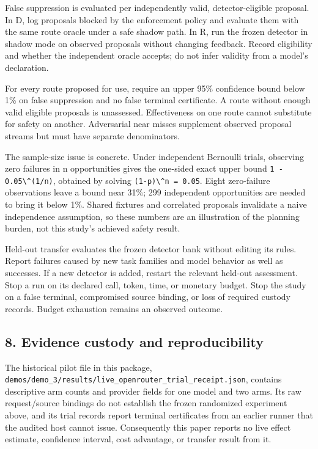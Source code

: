 \documentclass[
  11pt,
]{article}
\newcommand{\passthrough}[1]{#1}
\begin{document}
False suppression is evaluated per independently valid,
detector-eligible proposal. In D, log proposals blocked by the
enforcement policy and evaluate them with the same route oracle under a
safe shadow path. In R, run the frozen detector in shadow mode on
observed proposals without changing feedback. Record eligibility and
whether the independent oracle accepts; do not infer validity from a
model's declaration.

For every route proposed for use, require an upper 95\% confidence bound
below 1\% on false suppression and no false terminal certificate. A
route without enough valid eligible proposals is unassessed.
Effectiveness on one route cannot substitute for safety on another.
Adversarial near misses supplement observed proposal streams but must
have separate denominators.

The sample-size issue is concrete. Under independent Bernoulli trials,
observing zero failures in n opportunities gives the one-sided exact
upper bound \passthrough{\lstinline!1 - 0.05\^(1/n)!}, obtained by
solving \passthrough{\lstinline!(1-p)\^n = 0.05!}. Eight zero-failure
observations leave a bound near 31\%; 299 independent opportunities are
needed to bring it below 1\%. Shared fixtures and correlated proposals
invalidate a naive independence assumption, so these numbers are an
illustration of the planning burden, not this study's achieved safety
result.

Held-out transfer evaluates the frozen detector bank without editing its
rules. Report failures caused by new task families and model behavior as
well as successes. If a new detector is added, restart the relevant
held-out assessment. Stop a run on its declared call, token, time, or
monetary budget. Stop the study on a false terminal, compromised source
binding, or loss of required custody records. Budget exhaustion remains
an observed outcome.

\subsection{8. Evidence custody and
reproducibility}\label{evidence-custody-and-reproducibility}

The historical pilot file in this package,
\nolinkurl{demos/demo_3/results/live_openrouter_trial_receipt.json},
contains descriptive arm counts and provider fields for one model and
two arms. Its raw request/source bindings do not establish the frozen
randomized experiment above, and its trial records report terminal
certificates from an earlier runner that the audited host cannot issue.
Consequently this paper reports no live effect estimate, confidence
interval, cost advantage, or transfer result from it.
\end{document}
